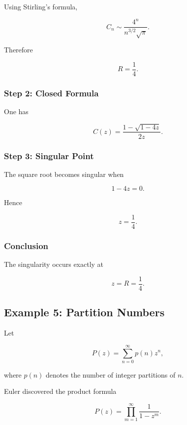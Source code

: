 \documentclass[12pt,a4paper]{article}
\theoremstyle{notespace}
\begin{document}
Using Stirling's formula,

\[
C_n
\sim
\frac{4^n}
{n^{3/2}\sqrt{\pi}}.
\]

Therefore

\[
R=\frac14.
\]

\subsubsection*{Step 2: Closed Formula}

One has

\[
C(z)
=
\frac{1-\sqrt{1-4z}}
{2z}.
\]

\subsubsection*{Step 3: Singular Point}

The square root becomes singular when

\[
1-4z=0.
\]

Hence

\[
z=\frac14.
\]

\subsubsection*{Conclusion}

The singularity occurs exactly at

\[
z=R=\frac14.
\]

\begin{center}
\end{center}

\bigskip

\subsection{Example 5: Partition Numbers}

Let

\[
P(z)=
\sum_{n=0}^{\infty}
p(n)z^n,
\]

where \(p(n)\) denotes the number of integer partitions of \(n\).

Euler discovered the product formula

\[
P(z)
=
\prod_{m=1}^{\infty}
\frac1{1-z^m}.
\]
\end{document}
